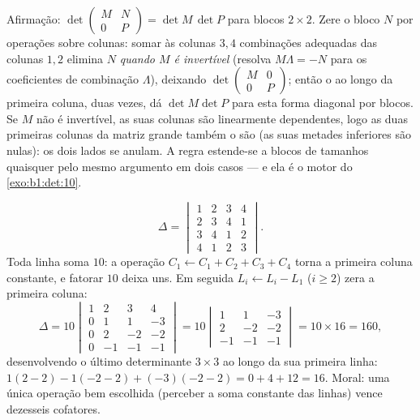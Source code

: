 \begin{example}
\label{ex:b1:det:blocktriangular}
Afirmação: $\det\begin{pmatrix} M & N\\ 0 & P\end{pmatrix} = \det
M\,\det P$ para blocos $2\times2$. Zere o bloco $N$ por operações
sobre colunas: somar às colunas $3, 4$ combinações adequadas das
colunas $1, 2$ elimina $N$ \emph{quando $M$ é invertível} (resolva
$M\Lambda = -N$ para os coeficientes de combinação $\Lambda$), deixando $\det\begin{pmatrix} M & 0\\ 0 & P\end{pmatrix}$;
então o  ao longo da primeira coluna,
duas vezes, dá $\det
M\det P$ para esta forma diagonal por blocos. Se $M$ não
é invertível, as suas colunas são linearmente dependentes, logo as
duas primeiras colunas da matriz grande também o são (as suas
metades inferiores são nulas): os dois lados se anulam. A regra
estende-se a blocos de tamanhos quaisquer pelo mesmo argumento em
dois casos --- e ela é o motor do \cref{exo:b1:det:10}.
\end{example}

\begin{example}
\label{ex:b1:det:fourbyfour}
\[
\Delta = \begin{vmatrix}
1 & 2 & 3 & 4\\
2 & 3 & 4 & 1\\
3 & 4 & 1 & 2\\
4 & 1 & 2 & 3
\end{vmatrix}.
\]
Toda linha soma $10$: a operação $C_1 \leftarrow C_1 + C_2 +
C_3 + C_4$ torna a primeira coluna
constante, e fatorar $10$ deixa uns. Em seguida $L_i \leftarrow L_i - L_1$ ($i \geq 2$) zera a
primeira coluna:
\[
\Delta = 10\begin{vmatrix}
1 & 2 & 3 & 4\\
0 & 1 & 1 & -3\\
0 & 2 & -2 & -2\\
0 & -1 & -1 & -1
\end{vmatrix}
= 10\begin{vmatrix}
1 & 1 & -3\\
2 & -2 & -2\\
-1 & -1 & -1
\end{vmatrix}
= 10 \times 16 = 160,
\]
desenvolvendo o último determinante $3\times3$ ao longo da sua primeira
linha: $1(2 - 2) - 1(-2 - 2) + (-3)(-2 - 2) = 0 + 4 + 12 = 16$. Moral: uma única operação bem escolhida (perceber a
soma constante das linhas) vence dezesseis cofatores.
\end{example}

